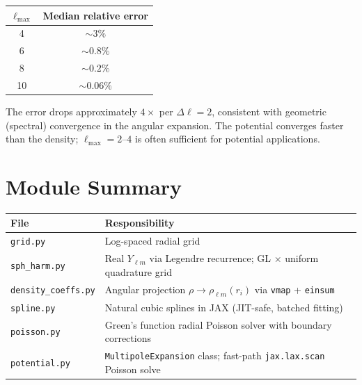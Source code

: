\documentclass[11pt]{article}
\begin{document}
\begin{center}
\begin{tabular}{cc}
\toprule
$\ell_{\max}$ & Median relative error \\
\midrule
4  & $\sim 3\%$ \\
6  & $\sim 0.8\%$ \\
8  & $\sim 0.2\%$ \\
10 & $\sim 0.06\%$ \\
\bottomrule
\end{tabular}
\end{center}

The error drops approximately $4\times$ per $\Delta\ell = 2$, consistent
with geometric (spectral) convergence in the angular expansion.  The potential
converges faster than the density; $\ell_{\max} = 2$--$4$ is often sufficient
for potential applications.

\section{Module Summary}

\begin{center}
\begin{tabular}{ll}
\toprule
File & Responsibility \\
\midrule
\texttt{grid.py}          & Log-spaced radial grid \\
\texttt{sph\_harm.py}     & Real $Y_{\ell m}$ via Legendre recurrence; GL $\times$ uniform quadrature grid \\
\texttt{density\_coeffs.py} & Angular projection $\rho \to \rho_{\ell m}(r_i)$ via \texttt{vmap} + \texttt{einsum} \\
\texttt{spline.py}        & Natural cubic splines in JAX (JIT-safe, batched fitting) \\
\texttt{poisson.py}       & Green's function radial Poisson solver with boundary corrections \\
\texttt{potential.py}     & \texttt{MultipoleExpansion} class; fast-path \texttt{jax.lax.scan} Poisson solve \\
\bottomrule
\end{tabular}
\end{center}
\end{document}
